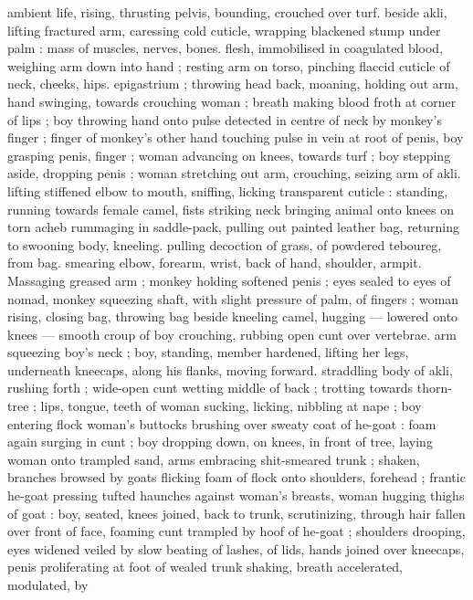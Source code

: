 {ambient life, rising, thrusting pelvis, bounding, crouched over turf. 
beside akli, lifting fractured arm, caressing cold cuticle, wrapping 
blackened stump under palm : mass of muscles, nerves, bones. 
flesh, immobilised in coagulated blood, weighing arm down into hand 
; resting arm on torso, pinching flaccid cuticle of neck, cheeks, hips. 
epigastrium ; throwing head back, moaning, holding out arm, hand 
swinging, towards crouching woman ; breath making blood froth at 
corner of lips ; boy throwing hand onto pulse detected in centre of 
neck by monkey's finger ; finger of monkey's other hand touching 
pulse in vein at root of penis, boy grasping penis, finger ; woman 
advancing on knees, towards turf ; boy stepping aside, dropping 
penis ; woman stretching out arm, crouching, seizing arm of akli. 
lifting stiffened elbow to mouth, sniffing, licking transparent cuticle : 
standing, running towards female camel, fists striking neck bringing 
animal onto knees on torn acheb rummaging in saddle-pack, pulling 
out painted leather bag, returning to swooning body, kneeling. 
pulling decoction of grass, of powdered teboureg, from bag. 
smearing elbow, forearm, wrist, back of hand, shoulder, armpit. 
Massaging greased arm ; monkey holding softened penis ; eyes 
sealed to eyes of nomad, monkey squeezing shaft, with slight 
pressure of palm, of fingers ; woman rising, closing bag, throwing 
bag beside kneeling camel, hugging --- lowered onto knees --- 
smooth croup of boy crouching, rubbing open cunt over vertebrae. 
arm squeezing boy's neck ; boy, standing, member hardened, lifting 
her legs, underneath kneecaps, along his flanks, moving forward. 
straddling body of akli, rushing forth ; wide-open cunt wetting 
middle of back ; trotting towards thorn-tree ; lips, tongue, teeth of 
woman sucking, licking, nibbling at nape ; boy entering flock {\gl} 
woman's buttocks brushing over sweaty coat of he-goat : foam again 
surging in cunt ; boy dropping down, on knees, in front of tree, 
laying woman onto trampled sand, arms embracing shit-smeared 
trunk ; shaken, branches browsed by goats flicking foam of flock 
onto shoulders, forehead ; frantic he-goat pressing tufted haunches 
against woman's breasts, woman hugging thighs of goat : boy, 
seated, knees joined, back to trunk, scrutinizing, through hair fallen 
over front of face, foaming cunt trampled by hoof of he-goat ; 
shoulders drooping, eyes widened veiled by slow beating of lashes, 
of lids, hands joined over kneecaps, penis proliferating at foot of 
wealed trunk shaking, breath accelerated, modulated, by 
}
